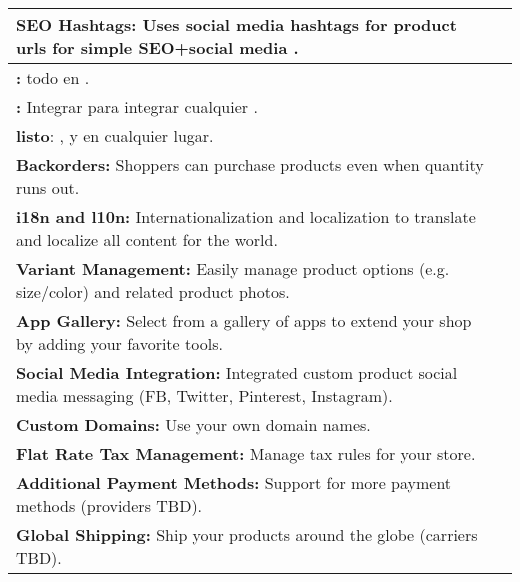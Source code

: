 \begin{table}[h!]
\begin{tabular}{ |L{0.6\paperwidth}|L{0.1\paperwidth}|}
\\ \hline
	\textbf{ SEO Hashtags:} Uses social media hashtags for product urls for simple SEO+social media \tracking.&
	
\\ \hline
	\textbf{ \onepage \checkout:} \checkout todo en \onepage.&
	
\\ \hline
	\textbf{ \shop \analytics:} Integrar \tracking \frameworkPC para integrar cualquier \analytics \system.&
	
\\ \hline
	\textbf{ \dockerio listo}: \build, \ship y \run en cualquier lugar.&
	
\\ \hline
	 \textbf{ Backorders:} Shoppers can purchase products even when quantity runs out.&
	
\\ \hline
	\textbf{ i18n and l10n:} Internationalization and localization to translate and localize all content for the world.&
	
\\ \hline
	\textbf{ Variant Management:} Easily manage product options (e.g. size/color) and related product photos.&
	
\\ \hline
	\textbf{ App Gallery:} Select from a gallery of apps to extend your shop by adding your favorite tools.&
	
\\ \hline
	\textbf{ Social Media Integration:} Integrated custom product social media messaging (FB, Twitter, Pinterest, Instagram).&
	
\\ \hline
	\textbf{ Custom Domains:} Use your own domain names.&
	
\\ \hline
	\textbf{ Flat Rate Tax Management:} Manage tax rules for your store.&
	
\\ \hline
	\textbf{ Additional Payment Methods:} Support for more payment methods (providers TBD).&
	
\\ \hline
	\textbf{ Global Shipping:} Ship your products around the globe (carriers TBD).&
	

\end{tabular}
\end{table}

